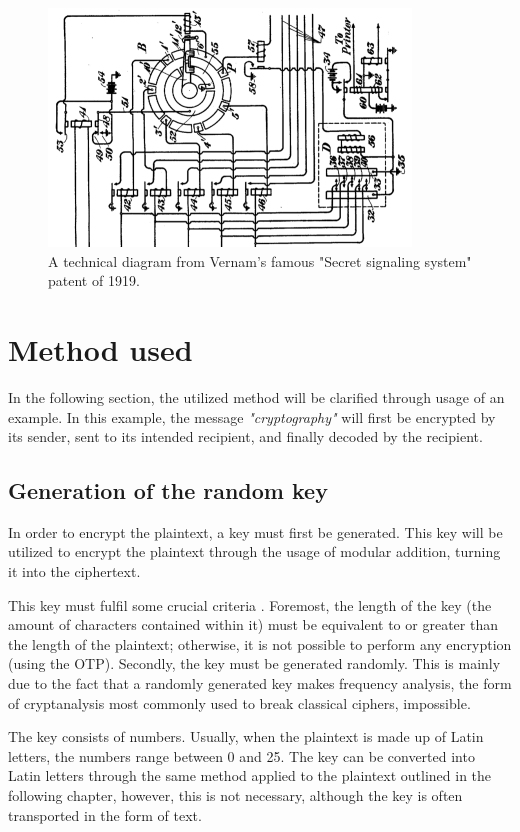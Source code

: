 \documentclass[12pt]{report}
\theoremstyle{definition}
\theoremstyle{remark}
\begin{document}
\begin{figure}[H]
\centering
\includegraphics[scale=1]{VernamCipher.jpg}
\caption{A technical diagram from Vernam's famous "Secret signaling system" patent of 1919.}
\end{figure}    

\section{Method used}
In the following section, the utilized method will be clarified through usage of an example. In this example, the message \textit{"cryptography"} will first be encrypted by its sender, sent to its intended recipient, and finally decoded by the recipient.

\subsection{Generation of the random key}
In order to encrypt the plaintext, a key must first be generated. This key will be utilized to encrypt the plaintext through the usage of modular addition, turning it into the ciphertext.

This key must fulfil some crucial criteria \cite{MilsElectronic}. Foremost, the length of the key (the amount of  characters contained within it) must be equivalent to or greater than the length of the plaintext; otherwise, it is not possible to perform any encryption (using the OTP). Secondly, the key must be generated randomly. This is mainly due to the fact that a randomly generated key makes frequency analysis\cite{FrequencyAnalysis}, the form of cryptanalysis most commonly used to break classical ciphers, impossible.


The key consists of numbers. Usually, when the plaintext is made up of Latin letters, the numbers range between 0 and 25. The key can be converted into Latin letters through the same method applied to the plaintext outlined in the following chapter, however, this is not necessary, although the key is often transported in the form of text.
\end{document}
